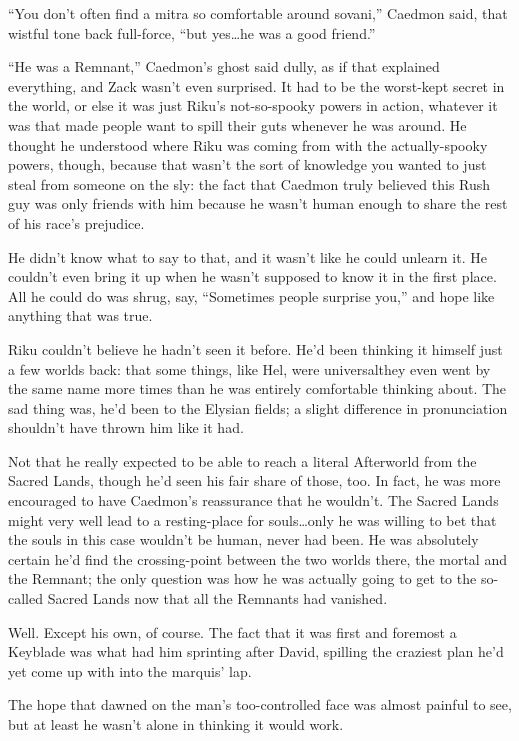 ``You don't often find a mitra so comfortable around sovani,'' Caedmon said, that wistful tone back full-force, ``but yes\ldots he was a good friend.''

``He was a Remnant,'' Caedmon's ghost said dully, as if that explained everything, and Zack wasn't even surprised. It had to be the worst-kept secret in the world, or else it was just Riku's not-so-spooky powers in action, whatever it was that made people want to spill their guts whenever he was around. He thought he understood where Riku was coming from with the actually-spooky powers, though, because that wasn't the sort of knowledge you wanted to just steal from someone on the sly: the fact that Caedmon truly believed this Rush guy was only friends with him because he wasn't human enough to share the rest of his race's prejudice.

He didn't know what to say to that, and it wasn't like he could unlearn it. He couldn't even bring it up when he wasn't supposed to know it in the first place. All he could do was shrug, say, ``Sometimes people surprise you,'' and hope like anything that was true.


\scenechange


Riku couldn't believe he hadn't seen it before. He'd been thinking it himself just a few worlds back: that some things, like Hel, were universal\textemdash they even went by the same name more times than he was entirely comfortable thinking about. The sad thing was, he'd been to the Elysian fields; a slight difference in pronunciation shouldn't have thrown him like it had.

Not that he really expected to be able to reach a literal Afterworld from the Sacred Lands, though he'd seen his fair share of those, too. In fact, he was more encouraged to have Caedmon's reassurance that he wouldn't. The Sacred Lands might very well lead to a resting-place for souls\ldots only he was willing to bet that the souls in this case wouldn't be human, never had been. He was absolutely certain he'd find the crossing-point between the two worlds there, the mortal and the Remnant; the only question was how he was actually going to get to the so-called Sacred Lands now that all the Remnants had vanished.

Well. Except his own, of course. The fact that it was first and foremost a Keyblade was what had him sprinting after David, spilling the craziest plan he'd yet come up with into the marquis' lap.

The hope that dawned on the man's too-controlled face was almost painful to see, but at least he wasn't alone in thinking it would work.

